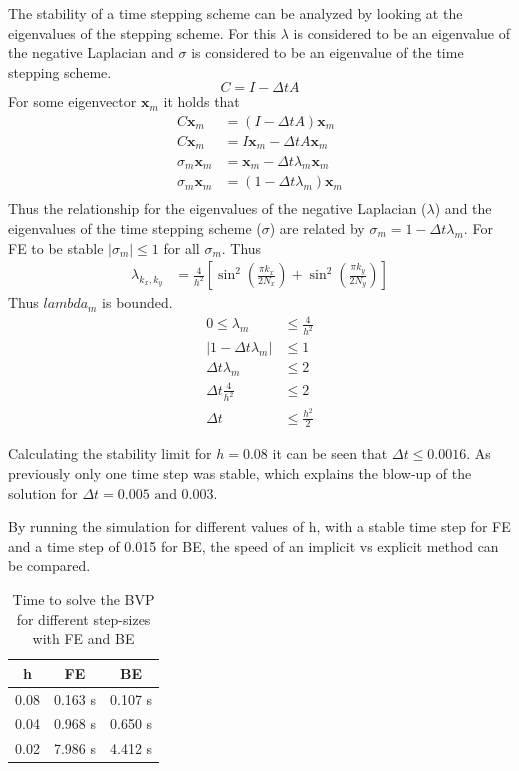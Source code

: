 \documentclass{article}
\begin{document}
The stability of a time stepping scheme can be analyzed by looking at the eigenvalues of the stepping scheme. For this $\lambda$ is considered to be an eigenvalue of the negative Laplacian and $\sigma$ is considered to be an eigenvalue of the time stepping scheme. 
\begin{equation}
	C = I - \Delta t A
\end{equation}
For some eigenvector $\mathbf{x}_m$ it holds that 
\begin{align}
C \mathbf{x}_m &= (I - \Delta t A)\mathbf{x}_m\\
C \mathbf{x}_m &= I\mathbf{x}_m - \Delta t A\mathbf{x}_m\\
\sigma_m \mathbf{x}_m &= \mathbf{x}_m - \Delta t \lambda_m \mathbf{x}_m\\
\sigma_m \mathbf{x}_m &= (1 - \Delta t \lambda_m )\mathbf{x}_m\\
\end{align}
Thus the relationship for the eigenvalues of the negative Laplacian ($\lambda$) and the eigenvalues of the time stepping scheme ($\sigma$) are related by $ \sigma_m = 1 - \Delta t \lambda_m$.
For FE to be stable $\left| \sigma_m\right|  \leq 1$ for all $\sigma_m$. Thus
\begin{align}
\lambda_{k_{x}, k_{y}}&=\frac{4}{h^{2}}\left[\sin ^{2}\left(\frac{\pi k_{x}}{2 N_{x}}\right)+\sin ^{2}\left(\frac{\pi k_{y}}{2 N_{y}}\right)\right]
\end{align}
Thus $lambda_m$ is bounded.
\begin{align}
0\leq\lambda_{m}&\leq\frac{4}{h^{2}}\\
\left| 1 - \Delta t \lambda_m \right| &\leq 1\\
\Delta t \lambda_m &\leq 2\\
\Delta t \frac{4}{h^{2}} &\leq 2\\
\Delta t  &\leq \frac{h^{2}}{2}
\end{align}

Calculating the stability limit for $h=0.08$ it can be seen that $\Delta t \leq 0.0016$. As previously only one time step was stable, which explains the blow-up of the solution for $\Delta t = 0.005 \text{ and } 0.003$.

By running the simulation for different values of h, with a stable time step for FE and a time step of 0.015 for BE, the speed of an implicit vs explicit method can be compared.

\begin{table}[H]
	\centering
\begin{tabular}{c|c|c}
	h 	 & FE & BE \\ \hline
	0.08 &0.163 s&0.107 s\\ \hline
	0.04 &0.968 s&0.650 s    \\ \hline
	0.02 &7.986 s&4.412 s    \\ \hline
\end{tabular}
\caption{Time to solve the BVP for different step-sizes with FE and BE}
\end{table}
\end{document}
